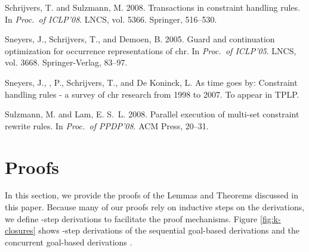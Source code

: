 \documentclass{tlp}
\begin{document}
\begin{thebibliography}{}
{\sc Schrijvers, T.} {\sc and} {\sc Sulzmann, M.} 2008.
\newblock Transactions in constraint handling rules.
\newblock In {\em Proc.\ of ICLP'08}. LNCS, vol. 5366. Springer, 516--530.

{\sc Sneyers, J.}, {\sc Schrijvers, T.}, {\sc and} {\sc Demoen, B.} 2005.
\newblock Guard and continuation optimization for occurrence representations of
  chr.
\newblock In {\em Proc.\ of ICLP'05}. LNCS, vol. 3668. Springer-Verlag, 83--97.

{\sc Sneyers, J.}, {, P.}, {\sc Schrijvers, T.}, {\sc and} {\sc
  {De Koninck}, L.}
\newblock As time goes by: Constraint handling rules - a survey of chr research
  from 1998 to 2007.
\newblock To appear in TPLP.

{\sc Sulzmann, M.} {\sc and} {\sc Lam, E. S.~L.} 2008.
\newblock Parallel execution of multi-set constraint rewrite rules.
\newblock In {\em Proc.\ of PPDP'08}. ACM Press, 20--31.

\end{thebibliography}


\section{Proofs} \label{sec:proofs}


In this section, we provide the proofs of the Lemmas and Theorems discussed in this 
paper. Because many of our proofs rely on inductive steps on the derivations, 
we define -step derivations to facilitate the proof mechanisms. Figure 
\ref{fig:k-closures} shows -step derivations of the sequential goal-based derivations 
 and the concurrent goal-based derivations . 
\end{document}
